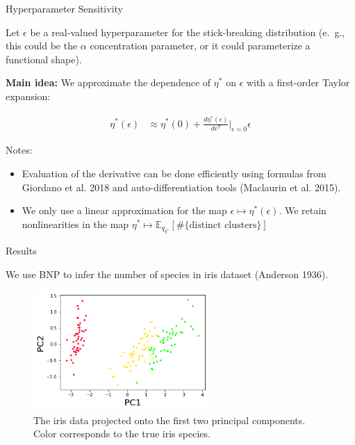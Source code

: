 \documentclass[10pt]{beamer}\usepackage[]{graphicx}\usepackage[]{color}
\newcommand{\Expect}{\mathbb{E}}
\begin{document}
\begin{frame}{Hyperparameter Sensitivity}

Let $\epsilon$ be a real-valued hyperparameter for the stick-breaking distribution
(e.\ g., this could be the $\alpha$ concentration parameter, or it could parameterize a functional shape).

\pause

{\bf Main idea: } We approximate the dependence of $\eta^*$ on $\epsilon$ with a first-order
Taylor expansion:

\begin{align*}
  \eta^*(\epsilon)  &\approx  \eta^*(0) +
  \frac{d \eta^*(\epsilon)}{d\epsilon^T}\Big|_{\epsilon=0} \epsilon
\end{align*}

\pause 

Notes: 
\begin{itemize}
\item Evaluation of the derivative can be done efficiently using formulas from Giordano et al. 2018 and auto-differentiation tools (Maclaurin et al. 2015).
 
\item We only use a linear approximation for the map $\epsilon \mapsto \eta^*(\epsilon)$. We retain nonlinearities in the map $\eta^* \mapsto
\Expect_{q_{\eta^*}} \left[ \#\{\text{distinct clusters}\} \right]$

\end{itemize}
\end{frame}

\begin{frame}{Results}

We use BNP to infer the number of species in iris dataset (Anderson 1936). 

\begin{figure}[!h]
\centering
\includegraphics[width = 0.6\textwidth]{./images/iris_data.png}

\caption{The iris data projected onto the first two principal components. Color corresponds to the true iris species. }

\setlength{\textfloatsep}{-10pt}
\end{figure}

\end{frame}
\end{document}

